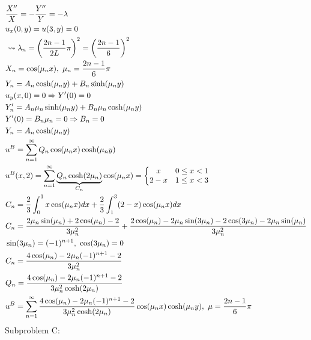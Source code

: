 \documentclass[11pt, fleqn]{article}
\begin{document}
\begin{align*}
    &\frac{X''}{X}=-\frac{Y''}{Y}=-\lambda\\
    &u_x(0,y)=u(3,y)=0\\
    &\leadsto\lambda_n=\brround{\frac{2n-1}{2L}\pi}^2=\brround{\frac{2n-1}{6}}^2\\
    &X_n=\cos(\mu_n x),\ \mu_n=\frac{2n-1}{6}\pi\\
    &Y_n=A_n\cosh(\mu_n y)+B_n\sinh(\mu_n y)\\
    &u_y(x,0)=0\Ra Y'(0)=0\\
    &Y_n'=A_n\mu_n\sinh(\mu_ny)+B_n\mu_n\cosh(\mu_ny)\\
    &Y'(0)=B_n\mu_n=0\Ra B_n=0\\
    &Y_n=A_n\cosh(\mu_ny)\\
    &u^B=\sum_{n=1}^\infty Q_n\cos(\mu_nx)\cosh(\mu_n y)\\
    &u^B(x,2)=\sum_{n=1}^\infty \underbrace{Q_n\cosh(2\mu_n)}_{C_n}\cos(\mu_nx)=\eqnsystem{x & 0\leq x<1\\ 2-x & 1\leq x <3}\\
    &C_n=\frac{2}{3}\int_0^1 x\cos(\mu_nx)dx+\frac{2}{3}\int_1^3(2-x)\cos(\mu_nx)dx\\
    &C_n=\frac{2\mu_n\sin(\mu_n)+2\cos(\mu_n)-2}{3\mu_n^2}+\frac{2\cos(\mu_n)-2\mu_n\sin(3\mu_n)-2\cos(3\mu_n)-2\mu_n\sin(\mu_n)}{3\mu_n^2}\\
    &\sin(3\mu_n)=(-1)^{n+1},\ \cos(3\mu_n)=0\\
    &C_n=\frac{4\cos(\mu_n)-2\mu_n(-1)^{n+1}-2}{3\mu_n^2}\\
    &Q_n=\frac{4\cos(\mu_n)-2\mu_n(-1)^{n+1}-2}{3\mu_n^2\cosh(2\mu_n)}\\
    &u^B=\sum_{n=1}^\infty\frac{4\cos(\mu_n)-2\mu_n(-1)^{n+1}-2}{3\mu_n^2\cosh(2\mu_n)}\cos(\mu_nx)\cosh(\mu_ny),\ \mu=\frac{2n-1}{6}\pi
\end{align*}
Subproblem C:
\end{document}
